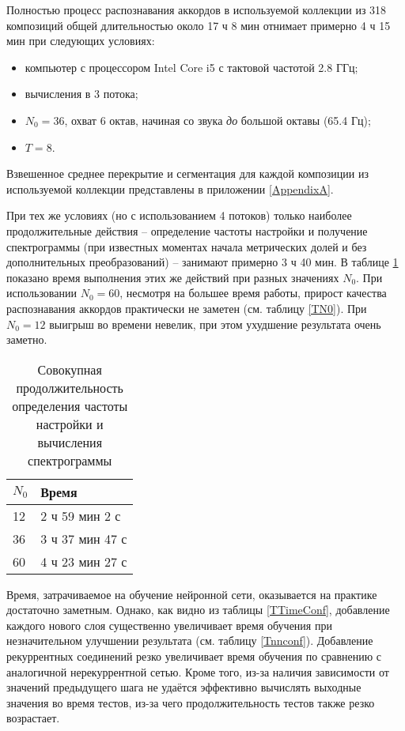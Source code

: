 Полностью процесс распознавания аккордов в используемой коллекции из 318
композиций общей длительностью около 17 ч 8 мин отнимает примерно 4 ч 15 мин при
следующих условиях:
\begin{itemize}
  \item компьютер с процессором Intel Core i5 с тактовой частотой 2.8 ГГц;
  \item вычисления в 3 потока;
  \item $N_0=36$, охват 6 октав, начиная со звука \emph{до} большой октавы
  (65.4 Гц);
  \item $T=8$.
\end{itemize}
Взвешенное среднее перекрытие и сегментация для каждой композиции из
используемой коллекции представлены в приложении \ref{AppendixA}.

При тех же условиях (но с использованием 4 потоков) только наиболее
продолжительные действия -- определение частоты настройки и получение
спектрограммы (при известных моментах начала метрических долей и без
дополнительных преобразований) -- занимают примерно 3 ч 40 мин. В таблице
\ref{TTimeN0} показано время выполнения этих же действий при разных значениях
$N_0$. При использовании $N_0=60$, несмотря на большее время работы, прирост
качества распознавания аккордов практически не заметен (см. таблицу \ref{TN0}).
При $N_0=12$ выигрыш во времени невелик, при этом ухудшение результата очень
заметно.

\begin{table} [htbp]
  \centering
  \parbox{15cm}{\caption{Совокупная продолжительность определения частоты
  настройки и вычисления спектрограммы}
  \label{TTimeN0}}
  \begin{tabular}{|l|l|}
  \hline
  $N_0$ & Время \\
  \hline
  12 & 2 ч 59 мин 2 с \\
  36 & 3 ч 37 мин 47 с \\
  60 & 4 ч 23 мин 27 с\\
  \hline
  \end{tabular}
\end{table}

Время, затрачиваемое на обучение нейронной сети, оказывается на практике
достаточно заметным. Однако, как видно из таблицы \ref{TTimeConf}, добавление
каждого нового слоя существенно увеличивает время обучения при незначительном
улучшении результата (см. таблицу \ref{Tnnconf}). Добавление рекуррентных
соединений резко увеличивает время обучения по сравнению с аналогичной
нерекуррентной сетью. Кроме того, из-за наличия зависимости от значений
предыдущего шага не удаётся эффективно вычислять выходные значения во время
тестов, из-за чего продолжительность тестов также резко возрастает.

